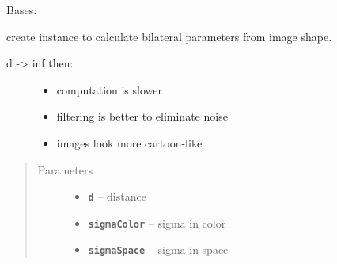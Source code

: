 \documentclass[letterpaper,10pt,english]{sphinxmanual}
\begin{document}
\begin{fulllineitems}
\label{RRtoolbox.lib.arrayops:RRtoolbox.lib.arrayops.filters.BilateralParameters}
Bases: 

create instance to calculate bilateral
parameters from image shape.
\begin{description}
\item[{d -\textgreater{} inf then:}] \leavevmode\begin{itemize}
\item {} 
computation is slower

\item {} 
filtering is better to eliminate noise

\item {} 
images look more cartoon-like

\end{itemize}

\end{description}
\begin{quote}\begin{description}
\item[{Parameters}] \leavevmode\begin{itemize}
\item {} 
\textbf{\texttt{d}} -- distance

\item {} 
\textbf{\texttt{sigmaColor}} -- sigma in color

\item {} 
\textbf{\texttt{sigmaSpace}} -- sigma in space

\end{itemize}

\end{description}\end{quote}

\begin{fulllineitems}
\label{RRtoolbox.lib.arrayops:RRtoolbox.lib.arrayops.filters.BilateralParameters.d}
\end{fulllineitems}



\end{fulllineitems}
\end{document}
